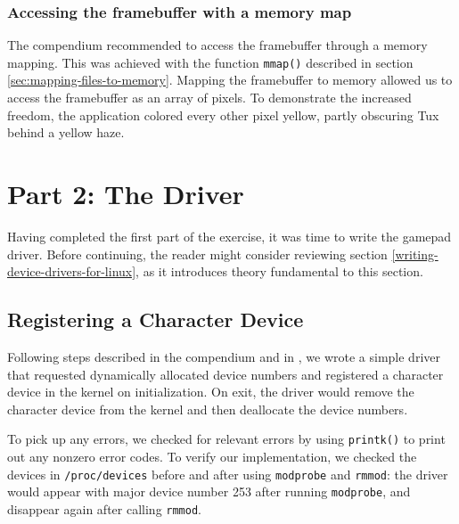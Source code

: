 
\subsubsection{Accessing the framebuffer with a memory map}
The compendium recommended to access the framebuffer through a memory mapping. This was achieved with the function \texttt{mmap()} described in section \ref{sec:mapping-files-to-memory}. Mapping the framebuffer to memory allowed us to access the framebuffer as an array of pixels. To demonstrate the increased freedom, the application colored every other pixel yellow, partly obscuring Tux behind a yellow haze.


\section{Part 2: The Driver}
Having completed the first part of the exercise, it was time to write the gamepad driver. Before continuing, the reader might consider reviewing section \ref{writing-device-drivers-for-linux}, as it introduces theory fundamental to this section.

\subsection{Registering a Character Device}
Following steps described in the compendium and in \cite{linux-device-drivers}, we wrote a simple driver that requested dynamically allocated device numbers and registered a character device in the kernel on initialization. On exit, the driver would remove the character device from the kernel and then deallocate the device numbers.

To pick up any errors, we checked for relevant errors by using \texttt{printk()} to print out any nonzero error codes. To verify our implementation, we checked the devices in \texttt{/proc/devices} before and after using \texttt{modprobe} and \texttt{rmmod}: the driver would appear with major device number 253 after running \texttt{modprobe}, and disappear again after calling \texttt{rmmod}.

